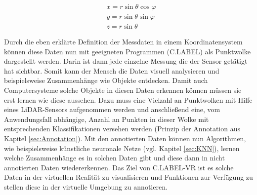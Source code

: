 \begin{subequations}
\begin{align}
        &x = r\sin\theta\cos\varphi \\
		&y = r\sin\theta\sin\varphi \\
		&z = r\sin\theta
\end{align}
\label{eq:SphToKart}
\end{subequations}

Durch die eben erklärte Definition der Messdaten in einem Koordinatensystem können diese Daten nun mit geeigneten Programmen (C.LABEL) als Punktwolke dargestellt werden. Darin ist dann jede einzelne Messung die der Sensor getätigt hat sichtbar. Somit kann der Mensch die Daten visuell analysieren und beispielsweise Zusammenhänge wie Objekte entdecken. Damit auch Computersysteme solche Objekte in diesen Daten erkennen können müssen sie erst lernen wie diese aussehen. Dazu muss eine Vielzahl an Punktwolken mit Hilfe eines LiDAR-Sensors aufgenommen werden und anschließend eine, vom Anwendungsfall abhängige, Anzahl an Punkten in dieser Wolke mit entsprechenden Klassifikationen versehen werden (Prinzip der Annotation aus Kapitel \ref{sec:Annotation}). Mit den annotierten Daten können nun Algorithmen, wie beispielsweise künstliche neuronale Netze (vgl. Kapitel \ref{sec:KNN}), lernen welche Zusammenhänge es in solchen Daten gibt und diese dann in nicht annotierten Daten wiedererkennen. Das Ziel von C.LABEL-VR ist es solche Daten in der virtuellen Realität zu visualisieren und Funktionen zur Verfügung zu stellen diese in der virtuelle Umgebung zu annotieren.


